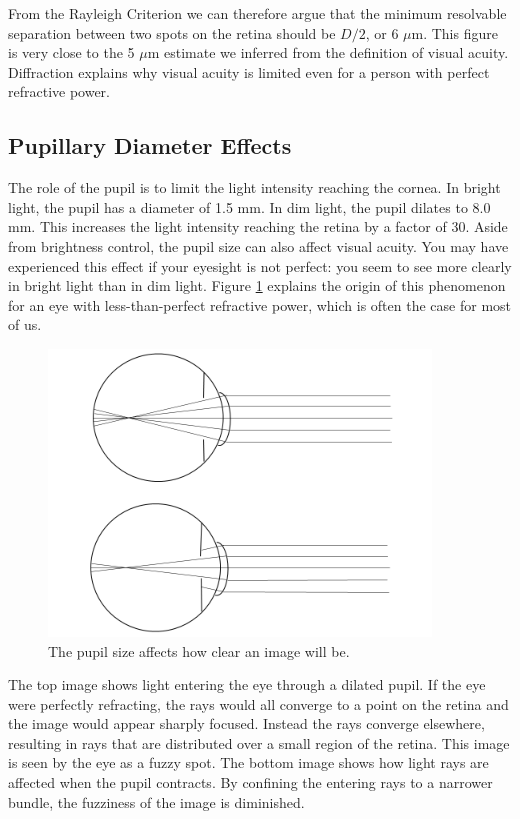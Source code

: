 From the Rayleigh Criterion we can therefore argue that the minimum resolvable separation between two spots on the retina should be $D/2$, or 6 $\mu$m. This figure is very close to the 5 $\mu$m estimate we inferred from the definition of visual acuity. Diffraction explains why visual acuity is limited even for a person with perfect refractive power.

\subsection{Pupillary Diameter Effects}

The role of the pupil is to limit the light intensity reaching the cornea.  In bright light, the pupil has a diameter of 1.5 mm.  In dim light, the pupil dilates to 8.0 mm.  This increases the light intensity reaching the retina by a factor of 30. Aside from brightness control, the pupil size can also affect visual acuity.  You may have experienced this effect if your eyesight is not perfect: you seem to see more clearly in bright light than in dim light. Figure \ref{Fig5-15} explains the origin of this phenomenon for an eye with less-than-perfect refractive power, which is often the case for most of us. 
\begin{figure}[h]
	\centering
	\includegraphics[width=4.0in]{./figures/Topic5/Fig5-15.png}
	\caption{The pupil size affects how clear an image will be.}
	\label{Fig5-15}
\end{figure} 
The top image shows light entering the eye through a dilated pupil. If the eye were perfectly refracting, the rays would all converge to a point on the retina and the image would appear sharply focused. Instead the rays converge elsewhere, resulting in rays that are distributed over a small region of the retina. This image is seen by the eye as a fuzzy spot. The bottom image shows how light rays are affected when the pupil contracts. By confining the entering rays to a narrower bundle, the fuzziness of the image is diminished. 

